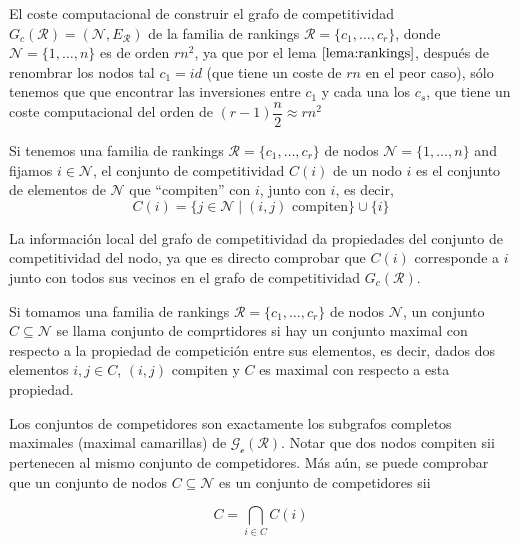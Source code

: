 \begin{nota}
El coste computacional de construir el grafo de competitividad $G_c(\mathcal{R}) = (\mathcal{N}, E_\mathcal{R})$ de la familia de rankings $\mathcal{R} = \{c_1,\dots,c_r\}$, donde $\mathcal{N} = \{1,\dots,n\}$ es de orden $rn^2$, ya que por el lema $\ref{lema:rankings}$, después de renombrar los nodos tal $c_1 = id$ (que tiene un coste de $rn$ en el peor caso), sólo tenemos que que encontrar las inversiones entre $c_1$ y cada una los $c_s$, que tiene un coste computacional del orden de $(r-1)\dfrac{n}{2} \approx rn^2$
\end{nota}

\begin{defi}
Si tenemos una familia de rankings $\mathcal{R} = \{c_1,\dots,c_r\}$ de nodos $\mathcal{N} = \{1,\dots,n\}$ and fijamos $i \in \mathcal{N}$, el conjunto de competitividad $C(i)$ de un nodo $i$ es el conjunto de elementos de $\mathcal{N}$ que ``compiten'' con $i$, junto con $i$, es decir,
\[C(i) = \{j \in \mathcal{N} \mid (i,j) \text{ compiten} \} \cup \{i\} \] 
\end{defi}

\begin{nota}
La información local del grafo de competitividad da propiedades del conjunto de competitividad del nodo, ya que es directo comprobar que $C(i)$ corresponde a $i$ junto con todos sus vecinos en el grafo de competitividad $G_c(\mathcal{R})$. 
\end{nota}

\begin{defi}
Si tomamos una familia de rankings $\mathcal{R} = \{c_1,\dots, c_r\}$ de nodos $\mathcal{N}$, un conjunto $C \subseteq \mathcal{N}$ se llama conjunto de comprtidores si hay un conjunto maximal con respecto a la propiedad de competición entre sus elementos, es decir, dados dos elementos $i,j \in C$, $(i,j)$ compiten y $C$ es maximal con respecto a esta propiedad.
\end{defi}

\begin{nota}
Los conjuntos de competidores son exactamente los subgrafos completos maximales (maximal camarillas) de $\mathcal{G_c(\mathcal{R})}$. Notar que dos nodos compiten sii pertenecen al mismo conjunto de competidores. Más aún, se puede comprobar que un conjunto de nodos $C \subseteq \mathcal{N}$ es un conjunto de competidores sii 

\[C = \bigcap_{i \in C} C(i)\]
\end{nota}


